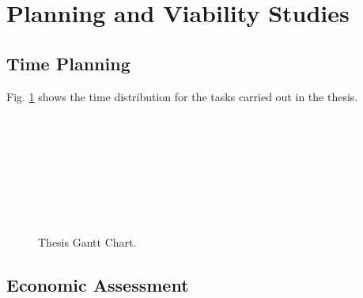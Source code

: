 \documentclass[a4paper,11pt, titlepage, twoside]{article}
\begin{document}
\section{Planning and Viability Studies}\label{Planning}

\subsection{Time Planning}

Fig. \ref{fig:gantt} shows the time distribution for the tasks carried out in the thesis.
\begin{figure}[h]
\begin{center}
\begin{ganttchart}{1}{20}
     \\
         \\
     \\
     \\
     \\
     \\
     \\
\end{ganttchart}
\caption{Thesis Gantt Chart.}
\label{fig:gantt}
\end{center}
\end{figure}

\subsection{Economic Assessment}
\end{document}
